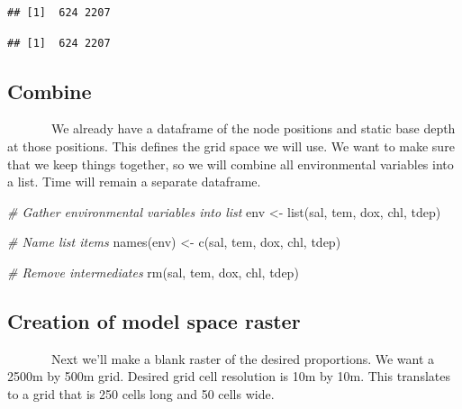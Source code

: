 \documentclass[
]{article}
\newenvironment{Shaded}{\begin{snugshade}}{\end{snugshade}}
\newcommand{\CommentTok}[1]{\textcolor[rgb]{0.56,0.35,0.01}{\textit{#1}}}
\newcommand{\FunctionTok}[1]{\textcolor[rgb]{0.00,0.00,0.00}{#1}}
\newcommand{\NormalTok}[1]{#1}
\newcommand{\OtherTok}[1]{\textcolor[rgb]{0.56,0.35,0.01}{#1}}
\newcommand{\StringTok}[1]{\textcolor[rgb]{0.31,0.60,0.02}{#1}}
\begin{document}
\begin{verbatim}
## [1]  624 2207
\end{verbatim}

\begin{verbatim}
## [1]  624 2207
\end{verbatim}

\onehalfspacing

\hypertarget{combine}{%
\subsection{Combine}\label{combine}}

~~~~~~~We already have a dataframe of the node positions and static base
depth at those positions. This defines the grid space we will use. We
want to make sure that we keep things together, so we will combine all
environmental variables into a list. Time will remain a separate
dataframe.

\singlespacing

\begin{Shaded}
\begin{Highlighting}[]
\CommentTok{\# Gather environmental variables into list}
\NormalTok{env }\OtherTok{\textless{}{-}} \FunctionTok{list}\NormalTok{(sal, tem, dox, chl, tdep)}

\CommentTok{\# Name list items}
\FunctionTok{names}\NormalTok{(env) }\OtherTok{\textless{}{-}} \FunctionTok{c}\NormalTok{(}\StringTok{\textquotesingle{}sal\textquotesingle{}}\NormalTok{, }\StringTok{\textquotesingle{}tem\textquotesingle{}}\NormalTok{, }\StringTok{\textquotesingle{}dox\textquotesingle{}}\NormalTok{, }\StringTok{\textquotesingle{}chl\textquotesingle{}}\NormalTok{, }\StringTok{\textquotesingle{}tdep\textquotesingle{}}\NormalTok{)}

\CommentTok{\# Remove intermediates}
\FunctionTok{rm}\NormalTok{(sal, tem, dox, chl, tdep)}
\end{Highlighting}
\end{Shaded}

\onehalfspacing

\hypertarget{creation-of-model-space-raster}{%
\subsection{Creation of model space
raster}\label{creation-of-model-space-raster}}

~~~~~~~Next we'll make a blank raster of the desired proportions. We
want a 2500m by 500m grid. Desired grid cell resolution is 10m by 10m.
This translates to a grid that is 250 cells long and 50 cells wide.
\end{document}
